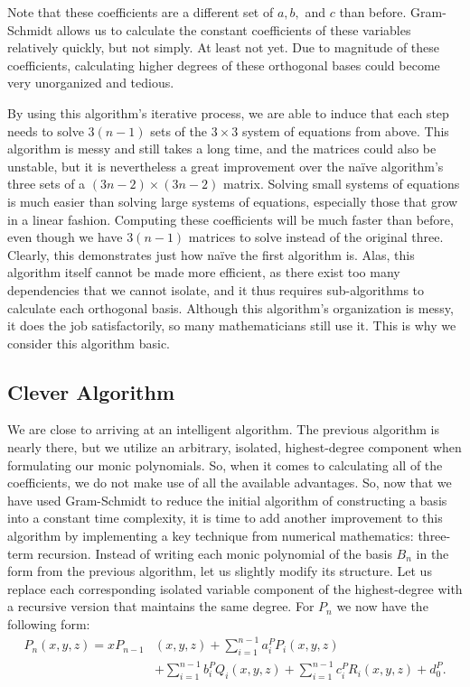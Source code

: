 \documentclass[letterpaper, 12pt]{article}
\begin{document}
\doublespacing
\vspace*{-5mm}
\noindent Note that these coefficients are a different set of $a, b,$ and $c$ than before. Gram-Schmidt allows us to calculate the constant coefficients of these variables relatively quickly, but not simply. At least not yet. Due to magnitude of these coefficients, calculating higher degrees of these orthogonal bases could become very unorganized and tedious. 

By using this algorithm's iterative process, we are able to induce that each step needs to solve $3(n-1)$ sets of the $3\times 3$ system of equations from above. This algorithm is messy and still takes a long time, and the matrices could also be unstable, but it is nevertheless a great improvement over the na\"ive algorithm's three sets of a $(3n-2)\times (3n-2)$ matrix. Solving small systems of equations is much easier than solving large systems of equations, especially those that grow in a linear fashion. Computing these coefficients will be much faster than before, even though we have $3(n-1)$ matrices to solve instead of the original three. Clearly, this demonstrates just how na\"ive the first algorithm is. Alas, this algorithm itself cannot be made more efficient, as there exist too many dependencies that we cannot isolate, and it thus requires sub-algorithms to calculate each orthogonal basis. Although this algorithm's organization is messy, it does the job satisfactorily, so many mathematicians still use it. This is why we consider this algorithm basic.







\newpage
\begin{centering}\section{Clever Algorithm}\end{centering}

We are close to arriving at an intelligent algorithm. The previous algorithm is nearly there, but we utilize an arbitrary, isolated, highest-degree component when formulating our monic polynomials. So, when it comes to calculating all of the coefficients, we do not make use of all the available advantages. So, now that we have used Gram-Schmidt to reduce the initial algorithm of constructing a basis into a constant time complexity, it is time to add another improvement to this algorithm by implementing a key technique from numerical mathematics: three-term recursion. Instead of writing each monic polynomial of the basis $B_n$ in the form from the previous algorithm, let us slightly modify its structure. Let us replace each corresponding isolated variable component of the highest-degree with a recursive version that maintains the same degree. For $P_n$ we now have the following form:
\begin{align*}
	P_n(x, y, z) = xP_{n-1}&(x, y, z) + \sum_{i=1}^{n-1} a_i^PP_i(x, y, z)\\ 
					&+ \sum_{i=1}^{n-1} b_i^PQ_i(x, y, z) + \sum_{i=1}^{n-1} c_i^PR_i(x, y, z) + d_0^P.
\end{align*}
\end{document}

